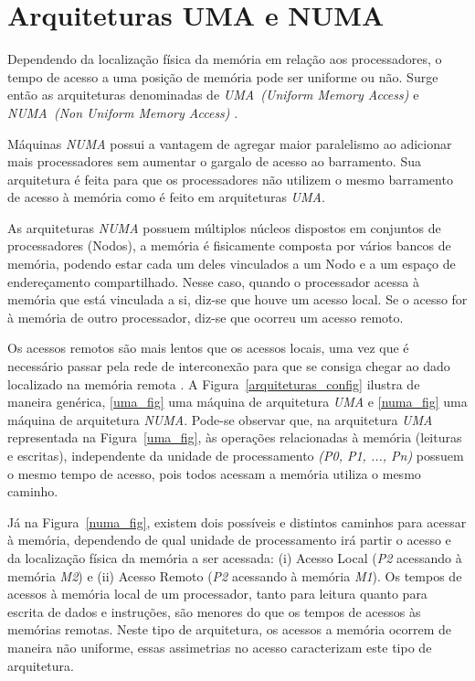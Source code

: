 \documentclass[ti]{texufpel}
\begin{document}
\section{Arquiteturas UMA e NUMA}

Dependendo da localização física da memória em relação aos processadores, o tempo de acesso a uma posição de memória pode ser uniforme ou não. Surge então as arquiteturas denominadas de \emph{UMA~(Uniform Memory Access)} e \emph{NUMA~(Non Uniform Memory Access)} \cite{carissimi07}.

Máquinas \emph{NUMA} possui a vantagem de agregar maior paralelismo ao adicionar mais processadores sem aumentar o gargalo de acesso ao barramento. Sua arquitetura é feita para que os processadores não utilizem o mesmo barramento de acesso à memória como é feito em arquiteturas \emph{UMA}.

As arquiteturas \emph{NUMA} possuem múltiplos núcleos dispostos em conjuntos de processadores (Nodos), a memória é fisicamente composta por vários bancos de memória, podendo estar cada um deles vinculados a um Nodo e a um espaço de endereçamento compartilhado. Nesse caso, quando o processador acessa à memória que está vinculada a si, diz-se que houve um acesso local. Se o acesso for à memória de outro processador, diz-se que ocorreu um acesso remoto.

Os acessos remotos são mais lentos que os acessos locais, uma vez que é necessário passar pela rede de interconexão para que se consiga chegar ao dado localizado na memória remota \cite{rodolfo14}. A Figura~\ref{arquiteturas_config} ilustra de maneira genérica, \ref{uma_fig} uma máquina de arquitetura \emph{UMA} e \ref{numa_fig} uma máquina de arquitetura \emph{NUMA}. Pode-se observar que, na arquitetura \emph{UMA} representada na Figura~\ref{uma_fig}, às operações relacionadas à memória (leituras e escritas), independente da unidade de processamento \emph{(P0, P1, ..., Pn)} possuem o mesmo tempo de acesso, pois todos acessam a memória utiliza o mesmo caminho.

Já na Figura~\ref{numa_fig}, existem dois possíveis e distintos caminhos para acessar à memória, dependendo de qual unidade de processamento irá partir o acesso e da localização física da memória a ser acessada: (i) Acesso Local (\emph{P2} acessando à memória \emph{M2}) e (ii) Acesso Remoto (\emph{P2} acessando à memória \emph{M1}). Os tempos de acessos à memória local de um processador, tanto para leitura quanto para escrita de dados e instruções, são menores do que os tempos de acessos às memórias remotas. Neste tipo de arquitetura, os acessos a memória ocorrem de maneira não uniforme, essas assimetrias no acesso caracterizam este tipo de arquitetura.
\end{document}
